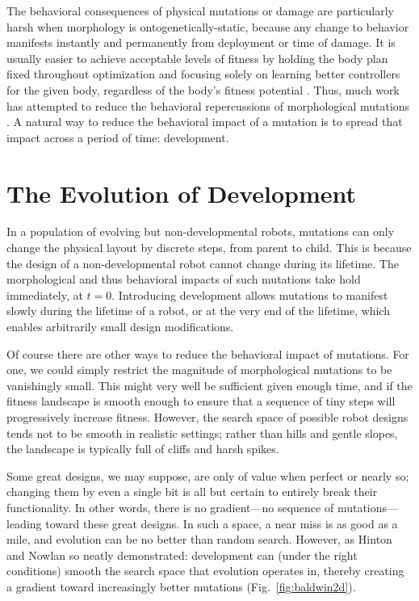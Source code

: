 The behavioral consequences of physical mutations or damage are particularly harsh when morphology is ontogenetically-static, because any change to behavior manifests instantly and permanently from deployment or time of damage.
It is usually easier to achieve acceptable levels of fitness by holding the body plan fixed throughout optimization and focusing solely on learning better controllers for the given body, regardless of the body's fitness potential \cite{cheney2016difficulty}.
Thus, much work has attempted to reduce the behavioral repercussions of morphological mutations \cite{cheney2018scalable}.
A natural way
to reduce the behavioral impact of a mutation 
is to spread that impact across a period of time: development.



\section{The Evolution of Development}
\label{sec:evo-devo}

In a population of evolving but non-developmental robots, mutations can only change the physical layout by discrete steps, from parent to child.
This is because the design of a non-developmental robot cannot change during its lifetime.
The morphological and thus behavioral impacts of such mutations take hold immediately, at $t=0$.
Introducing development allows mutations to manifest slowly during the lifetime of a robot, or at the very end of the lifetime, which enables arbitrarily small design modifications.

Of course there are other ways to reduce the behavioral impact of mutations.
For one, we could simply restrict the magnitude of morphological mutations to be vanishingly small.
This might very well be sufficient given enough time, and if the fitness landscape is smooth enough to ensure that a sequence of tiny steps will progressively increase fitness.
However, the search space of possible robot designs tends not to be smooth in realistic settings; rather than hills and gentle slopes, the landscape is typically full of cliffs and harsh spikes. 

Some great designs, we may suppose, are only of value when perfect or nearly so; changing them by even a single bit is all but certain to entirely break their functionality.
In other words, there is no gradient---no sequence of mutations---leading toward these great designs.
In such a space, a near miss is as good as a mile, and evolution can be no better than random search.
However, as Hinton and Nowlan \cite{hinton1987learning} so neatly demonstrated: development can (under the right conditions) smooth the search space that evolution operates in, thereby creating a gradient toward increasingly better mutations (Fig.~\ref{fig:baldwin2d}).


